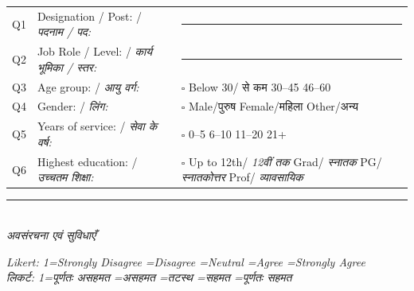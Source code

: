 \documentclass[10pt,a4paper]{article}
\newcommand{\blank}{\rule{7cm}{0.4pt}}
\begin{document}
\noindent\begin{tabularx}{\textwidth}{@{}L{0.8cm} L{7.7cm} X@{}}
Q1 & Designation / Post: / {\hindifont\small\itshape\color{black!70} पदनाम / पद:} & \blank \\[3pt]
Q2 & Job Role / Level: / {\hindifont\small\itshape\color{black!70} कार्य भूमिका / स्तर:} & \blank \\[3pt]
Q3 & Age group: / {\hindifont\small\itshape\color{black!70} आयु वर्ग:} & {\Large$\square$} Below 30/{ से कम}\quad{\Large$\square$} 30--45\quad{\Large$\square$} 46--60 \\[3pt]
Q4 & Gender: / {\hindifont\small\itshape\color{black!70} लिंग:} & {\Large$\square$} Male/{\hindifont पुरुष}\quad{\Large$\square$} Female/{\hindifont महिला}\quad{\Large$\square$} Other/{\hindifont अन्य} \\[3pt]
Q5 & Years of service: / {\hindifont\small\itshape\color{black!70} सेवा के वर्ष:} & {\Large$\square$} 0--5\quad{\Large$\square$} 6--10\quad{\Large$\square$} 11--20\quad{\Large$\square$} 21+ \\[3pt]
Q6 & Highest education: / {\hindifont\small\itshape\color{black!70} उच्चतम शिक्षा:} & {\Large$\square$} Up to 12th/{\hindifont\small\itshape\color{black!70} 12वीं तक}\quad{\Large$\square$} Grad/{\hindifont\small\itshape\color{black!70} स्नातक}\quad{\Large$\square$} PG/{\hindifont\small\itshape\color{black!70} स्नातकोत्तर}\quad{\Large$\square$} Prof/{\hindifont\small\itshape\color{black!70} व्यावसायिक} \\[3pt]
\end{tabularx}
\vspace{4pt}
\noindent\rule{\textwidth}{0.3pt}\vspace{3pt}
\\
{\hindifont\itshape\color{black!70} अवसंरचना एवं सुविधाएँ}\vspace{3pt}

\small\textit{Likert: 1=Strongly Disagree =Disagree =Neutral =Agree =Strongly Agree}
\\
{\hindifont\small\textit{लिकर्ट: 1=पूर्णतः असहमत =असहमत =तटस्थ =सहमत =पूर्णतः सहमत}}\vspace{3pt}
\end{document}
